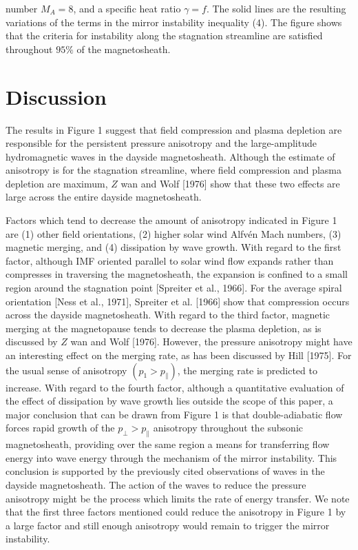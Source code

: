 \documentclass[10pt]{article}
\begin{document}
number $M_{A}=8$, and a specific heat ratio $\gamma=f$. The solid lines are the resulting variations of the terms in the mirror instability inequality (4). The figure shows that the criteria for instability along the stagnation streamline are satisfied throughout $95 \%$ of the magnetosheath.

\section{Discussion}
The results in Figure 1 suggest that field compression and plasma depletion are responsible for the persistent pressure anisotropy and the large-amplitude hydromagnetic waves in the dayside magnetosheath. Although the estimate of anisotropy is for the stagnation streamline, where field compression and plasma depletion are maximum, $Z$ wan and Wolf [1976] show that these two effects are large across the entire dayside magnetosheath.

Factors which tend to decrease the amount of anisotropy indicated in Figure 1 are (1) other field orientations, (2) higher solar wind Alfvén Mach numbers, (3) magnetic merging, and (4) dissipation by wave growth. With regard to the first factor, although IMF oriented parallel to solar wind flow expands rather than compresses in traversing the magnetosheath, the expansion is confined to a small region around the stagnation point [Spreiter et al., 1966]. For the average spiral orientation [Ness et al., 1971], Spreiter et al. [1966] show that compression occurs across the dayside magnetosheath. With regard to the third factor, magnetic merging at the magnetopause tends to decrease the plasma depletion, as is discussed by $Z$ wan and Wolf [1976]. However, the pressure anisotropy might have an interesting effect on the merging rate, as has been discussed by Hill [1975]. For the usual sense of anisotropy $\left(p_{1}>p_{\parallel}\right)$, the merging rate is predicted to increase. With regard to the fourth factor, although a quantitative evaluation of the effect of dissipation by wave growth lies outside the scope of this paper, a major conclusion that can be drawn from Figure 1 is that double-adiabatic flow forces rapid growth of the $p_{\perp}>p_{\parallel}$ anisotropy throughout the subsonic magnetosheath, providing over the same region a means for transferring flow energy into wave energy through the mechanism of the mirror instability. This conclusion is supported by the previously cited observations of waves in the dayside magnetosheath. The action of the waves to reduce the pressure anisotropy might be the process which limits the rate of energy transfer. We note that the first three factors mentioned could reduce the anisotropy in Figure 1 by a large factor and still enough anisotropy would remain to trigger the mirror instability.
\end{document}
